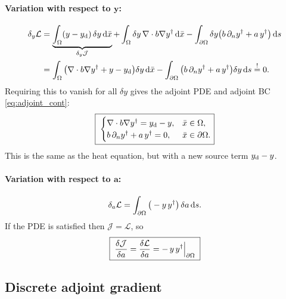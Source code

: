 \paragraph{Variation with respect to $\mathbf{y}$:}
\begin{align*}
\delta_y\mathcal{L}
&=\underbrace{\int_\Omega (y-y_{\mathrm{d}})\,\delta y\,\mathrm{d}\bar{x}}_{\delta_y\mathcal{J}}
+\int_\Omega\delta y\,\nabla\cdot b\nabla y^{\dagger}\,\mathrm{d}\bar{x}
-\int_{\partial\Omega}\delta y\big(b\,\partial_{n}y^{\dagger}+a\,y^{\dagger}\big)\,\mathrm{d} s \nonumber\\
&=\int_\Omega\big(\nabla\cdot b\nabla y^{\dagger}+y-y_{\mathrm{d}}\big)\delta y\,\mathrm{d}\bar{x}
-\int_{\partial\Omega}\big(b\,\partial_{n}y^{\dagger}+a\,y^{\dagger}\big)\delta y\,\mathrm{d} s\overset{!}{=}0 .
\end{align*}
Requiring this to vanish for all $\delta y$ gives the adjoint PDE and adjoint BC \eqref{eq:adjoint_cont}:
\begin{equation}
\boxed{\;
\begin{cases}
\nabla\cdot b\nabla y^{\dagger}=y_{\mathrm{d}}-y, & \bar{x}\in\Omega,\\
b\,\partial_{n}y^{\dagger}+a\,y^{\dagger}=0, & \bar{x}\in\partial\Omega.
\end{cases}}
\label{eq:adjoint_cont}
\end{equation}
This is the same as the heat equation, but with a new source term $y_{\mathrm{d}}-y$.

\paragraph{Variation with respect to $\mathbf{a}$:}
\begin{equation}
\delta_a\mathcal{L}=\int_{\partial\Omega}\big(-y\,y^{\dagger}\big)\,\delta a\,\mathrm{d} s .
\end{equation}
If the PDE is satisfied then $\mathcal{J}=\mathcal{L}$, so
\begin{equation}
\boxed{\;\frac{\delta\mathcal{J}}{\delta a}=\frac{\delta\mathcal{L}}{\delta a}=-\,y\,y^{\dagger}\Big|_{\partial\Omega}\;}
\end{equation}


\subsection{Discrete adjoint gradient}
